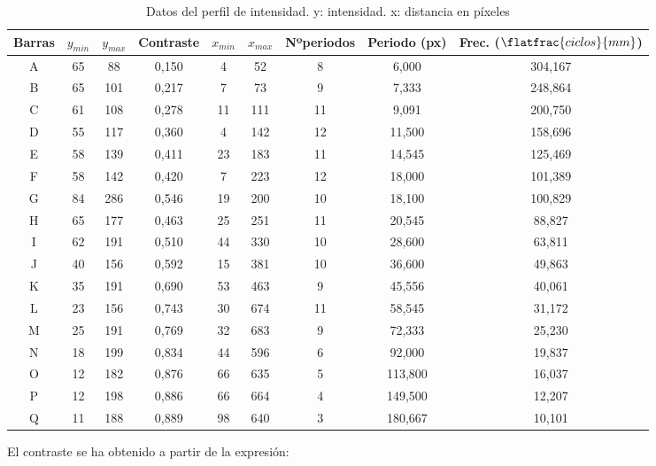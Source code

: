 \documentclass[12pt,a5paper]{article}
\begin{document}
\begin{table}[!ht]
    \centering
    \begin{tabular}{|c|c|c|c|c|c|c|c|c|}
    \hline
        Barras & $y_{min}$ & $y_{max}$ & Contraste & $x_{min}$ & $x_{max}$ & Nºperiodos & Periodo (px) & Frec. ($\flatfrac{ciclos}{mm}$) \\ \hline
        A & 65 & 88 & 0,150 & 4 & 52 & 8 & 6,000 & 304,167 \\ \hline
        B & 65 & 101 & 0,217 & 7 & 73 & 9 & 7,333 & 248,864 \\ \hline
        C & 61 & 108 & 0,278 & 11 & 111 & 11 & 9,091 & 200,750 \\ \hline
        D & 55 & 117 & 0,360 & 4 & 142 & 12 & 11,500 & 158,696 \\ \hline
        E & 58 & 139 & 0,411 & 23 & 183 & 11 & 14,545 & 125,469 \\ \hline
        F & 58 & 142 & 0,420 & 7 & 223 & 12 & 18,000 & 101,389 \\ \hline
        G & 84 & 286 & 0,546 & 19 & 200 & 10 & 18,100 & 100,829 \\ \hline
        H & 65 & 177 & 0,463 & 25 & 251 & 11 & 20,545 & 88,827 \\ \hline
        I & 62 & 191 & 0,510 & 44 & 330 & 10 & 28,600 & 63,811 \\ \hline
        J & 40 & 156 & 0,592 & 15 & 381 & 10 & 36,600 & 49,863 \\ \hline
        K & 35 & 191 & 0,690 & 53 & 463 & 9 & 45,556 & 40,061 \\ \hline
        L & 23 & 156 & 0,743 & 30 & 674 & 11 & 58,545 & 31,172 \\ \hline
        M & 25 & 191 & 0,769 & 32 & 683 & 9 & 72,333 & 25,230 \\ \hline
        N & 18 & 199 & 0,834 & 44 & 596 & 6 & 92,000 & 19,837 \\ \hline
        O & 12 & 182 & 0,876 & 66 & 635 & 5 & 113,800 & 16,037 \\ \hline
        P & 12 & 198 & 0,886 & 66 & 664 & 4 & 149,500 & 12,207 \\ \hline
        Q & 11 & 188 & 0,889 & 98 & 640 & 3 & 180,667 & 10,101 \\ \hline
    \end{tabular}
    \caption{\small Datos del perfil de intensidad. y: intensidad. x: distancia en píxeles}
    \label{table:perfilintensidad}
\end{table}

El contraste se ha obtenido a partir de la expresión:
\end{document}
